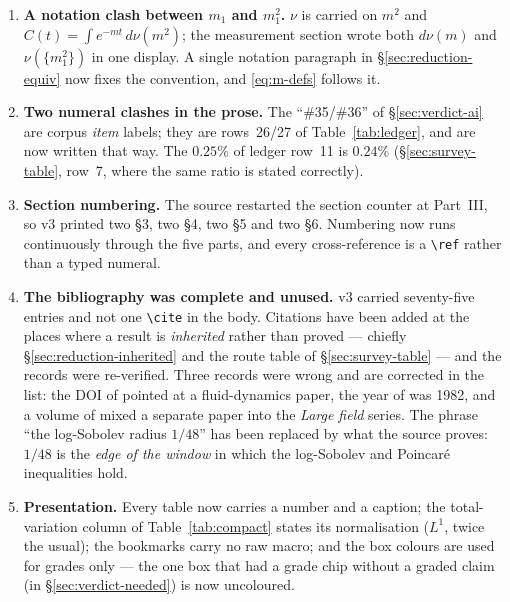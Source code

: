 \documentclass[11pt,a4paper]{article}
\newcounter{claim}
\begin{document}
\begin{v3box}
\begin{enumerate}[label=\textbf{R\arabic*.},leftmargin=2.8em,itemsep=2pt,topsep=3pt]
      say so too.
\item \textbf{A notation clash between $m_1$ and $m_1^2$.} $\nu$ is carried on $m^2$ and
      $C(t)=\int e^{-mt}\,d\nu(m^2)$; the measurement section wrote both $d\nu(m)$ and
      $\nu(\{m_1^2\})$ in one display. A single notation paragraph in \S\ref{sec:reduction-equiv}
      now fixes the convention, and \eqref{eq:m-defs} follows it.
\item \textbf{Two numeral clashes in the prose.} The ``\#35/\#36'' of \S\ref{sec:verdict-ai} are
      corpus \emph{item} labels; they are rows~26/27 of Table~\ref{tab:ledger}, and are now written
      that way. The $0.25\%$ of ledger row~11 is $0.24\%$ (\S\ref{sec:survey-table}, row~7, where the
      same ratio is stated correctly).
\item \textbf{Section numbering.} The source restarted the section counter at Part~III, so v3 printed
      two \S3, two \S4, two \S5 and two \S6. Numbering now runs continuously through the five parts,
      and every cross-reference is a \verb|\ref| rather than a typed numeral.
\item \textbf{The bibliography was complete and unused.} v3 carried seventy-five entries and not one
      \verb|\cite| in the body. Citations have been added at the places where a result is
      \emph{inherited} rather than proved --- chiefly \S\ref{sec:reduction-inherited} and the route
      table of \S\ref{sec:survey-table} --- and the records were re-verified. Three records were
      wrong and are corrected in the list: the DOI of \cite{mrs} pointed at a fluid-dynamics paper,
      the year of \cite{gopfert} was 1982, and a volume of \cite{balaban} mixed a separate paper into
      the \emph{Large field} series. The phrase ``the log-Sobolev radius $1/48$'' has been replaced
      by what the source proves: $1/48$ is the \emph{edge of the window} in which the log-Sobolev
      and Poincar\'e inequalities hold.
\item \textbf{Presentation.} Every table now carries a number and a caption; the total-variation
      column of Table~\ref{tab:compact} states its normalisation ($L^1$, twice the usual); the
      bookmarks carry no raw macro; and the box colours are used for grades only --- the one box that
      had a grade chip without a graded claim (in \S\ref{sec:verdict-needed}) is now uncoloured.
\end{enumerate}
\end{v3box}
\clearpage









\end{document}
